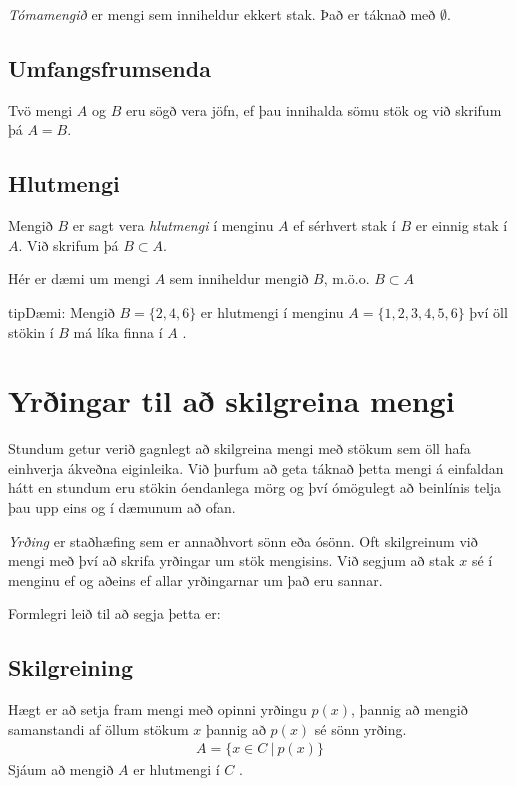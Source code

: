 \documentclass[a4paper,10pt,icelandic]{sphinxmanual}
\begin{document}
\textit{Tómamengið} er mengi sem inniheldur ekkert stak. Það er táknað með \(\emptyset\).


\subsection{Umfangsfrumsenda}
\label{\detokenize{Kafli04:umfangsfrumsenda}}
Tvö mengi \(A\) og \(B\) eru sögð vera jöfn,  ef þau innihalda sömu stök og við
skrifum þá \(A=B\).


\subsection{Hlutmengi}
\label{\detokenize{Kafli04:hlutmengi}}\label{\detokenize{Kafli04:s-hlutmengi}}
Mengið \(B\) er sagt vera \textit{hlutmengi} í menginu \(A\) ef sérhvert stak í \(B\) er einnig stak í \(A\). Við skrifum þá \(B \subset A\).


Hér er dæmi um mengi \(A\) sem inniheldur mengið \(B\), m.ö.o. \(B \subset A\)

\begin{sphinxadmonition}{tip}{Dæmi:}
Mengið \(B=\{ 2,4,6 \}\) er hlutmengi í menginu \(A=\{1,2,3,4,5,6\}\) því öll stökin í \(B\) má líka finna í \(A\) .
\end{sphinxadmonition}


\section{Yrðingar til að skilgreina mengi}
\label{\detokenize{Kafli04:yringar-til-a-skilgreina-mengi}}
Stundum getur verið gagnlegt að skilgreina mengi með stökum sem öll hafa einhverja
ákveðna eiginleika. Við þurfum að geta táknað þetta mengi á einfaldan hátt en stundum eru
stökin óendanlega mörg og því ómögulegt að beinlínis telja þau upp eins og í dæmunum að
ofan.

\textit{Yrðing} er staðhæfing sem er annaðhvort sönn eða ósönn.
Oft skilgreinum við mengi með því að skrifa yrðingar um stök mengisins.
Við segjum að stak \(x\) sé í menginu ef og aðeins ef allar yrðingarnar um það eru sannar.

Formlegri leið til að segja þetta er:


\subsection{Skilgreining}
\label{\detokenize{Kafli04:skilgreining}}
Hægt er að setja fram mengi með opinni yrðingu \(p(x)\), þannig að mengið samanstandi af öllum stökum  \(x\) þannig að \(p(x)\) sé sönn yrðing.
\begin{equation*}
\begin{split}A = \{x \in C \ | \ p(x)\}\end{split}
\end{equation*}
Sjáum að mengið \(A\) er hlutmengi í \(C\) .
\end{document}

